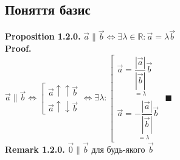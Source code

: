 \documentclass[a4paper, 14pt]{extarticle}
\def\rm#1{\textbf{Remark {#1}}}
\def\prp#1{\textbf{Proposition {#1}}}
\def\proof{\textbf{Proof.}\\}
\def\bigline{\vspace{5mm}\\}
\def\qed{$\blacksquare$}
\begin{document}
	\subsection{Поняття базис}
	\prp{1.2.0.} $\vec{a} \parallel \vec{b} \iff \exists \lambda \in \mathbb{R}: \vec{a} = \lambda \vec{b}$\\
	\proof
	$\vec{a} \parallel \vec{b} \iff \left[ \begin{gathered} \vec{a} \uparrow \uparrow \vec{b} \\ \vec{a} \uparrow \downarrow \vec{b} \end{gathered} \right. \iff \exists \lambda: \left[ \begin{gathered} \vec{a} = \underset{=\lambda}{\dfrac{|\vec{a}|}{|\vec{b}|}} \vec{b} \\ \vec{a} = \underset{=\lambda}{-\dfrac{|\vec{a}|}{|\vec{b}|}} \vec{b} \end{gathered} \right.$ \qed
	\bigline
	\rm{1.2.0.} $\vec{0} \parallel \vec{b}$ для будь-якого $\vec{b}$
\end{document}
